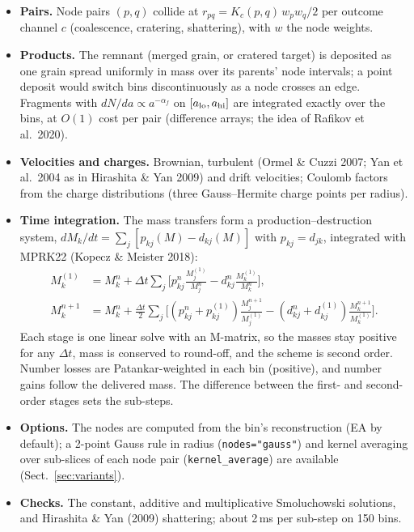 \documentclass[11pt,a4paper]{article}
\begin{document}
\begin{itemize}
\item \textbf{Pairs.} Node pairs $(p,q)$ collide at $r_{pq} = K_c(p,q)\,w_p w_q/2$ per outcome channel $c$
  (coalescence, cratering, shattering), with $w$ the node weights.
\item \textbf{Products.} The remnant (merged grain, or cratered target) is deposited as one grain spread uniformly in
  mass over its parents' node intervals; a point deposit would switch bins discontinuously as a node crosses an edge.
  Fragments with $dN/da\propto a^{-\alpha_f}$ on $[a_{\rm lo}, a_{\rm hi}]$ are integrated exactly over the bins, at
  $O(1)$ cost per pair (difference arrays; the idea of Rafikov et al.\ 2020).
\item \textbf{Velocities and charges.} Brownian, turbulent (Ormel \& Cuzzi 2007; Yan et al.\ 2004 as in Hirashita \&
  Yan 2009) and drift velocities; Coulomb factors from the charge distributions (three Gauss--Hermite charge points
  per radius).
\item \textbf{Time integration.} The mass transfers form a production--destruction system,
  $dM_k/dt = \sum_j [p_{kj}(M) - d_{kj}(M)]$ with $p_{kj} = d_{jk}$, integrated with MPRK22 (Kopecz \& Meister 2018):
  \begin{align*}
  M_k^{(1)} &= M_k^n + \Delta t\sum_j\Big[p^n_{kj}\frac{M_j^{(1)}}{M_j^n} - d^n_{kj}\frac{M_k^{(1)}}{M_k^n}\Big],\\
  M_k^{n+1} &= M_k^n + \frac{\Delta t}{2}\sum_j\Big[(p^n_{kj}+p^{(1)}_{kj})\frac{M_j^{n+1}}{M_j^{(1)}}
     - (d^n_{kj}+d^{(1)}_{kj})\frac{M_k^{n+1}}{M_k^{(1)}}\Big].
  \end{align*}
  Each stage is one linear solve with an M-matrix, so the masses stay positive for any $\Delta t$, mass is conserved to
  round-off, and the scheme is second order. Number losses are Patankar-weighted in each bin (positive), and number
  gains follow the delivered mass. The difference between the first- and second-order stages sets the sub-steps.
\item \textbf{Options.} The nodes are computed from the bin's reconstruction (EA by default); a 2-point Gauss rule
  in radius (\texttt{nodes="gauss"}) and kernel averaging over sub-slices of each node pair (\texttt{kernel\_average})
  are available (Sect.~\ref{sec:variants}).
\item \textbf{Checks.} The constant, additive and multiplicative Smoluchowski solutions, and Hirashita \& Yan (2009)
  shattering; about 2\,ms per sub-step on 150 bins.
\end{itemize}
\end{document}
